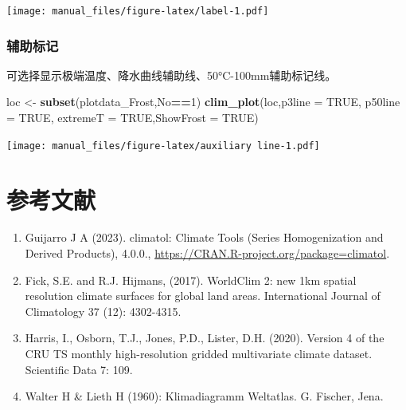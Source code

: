 \documentclass[
]{ctexart}
\newenvironment{Shaded}{\begin{snugshade}}{\end{snugshade}}
\newcommand{\AttributeTok}[1]{\textcolor[rgb]{0.13,0.29,0.53}{#1}}
\newcommand{\ConstantTok}[1]{\textcolor[rgb]{0.56,0.35,0.01}{#1}}
\newcommand{\DecValTok}[1]{\textcolor[rgb]{0.00,0.00,0.81}{#1}}
\newcommand{\FunctionTok}[1]{\textcolor[rgb]{0.13,0.29,0.53}{\textbf{#1}}}
\newcommand{\NormalTok}[1]{#1}
\newcommand{\OtherTok}[1]{\textcolor[rgb]{0.56,0.35,0.01}{#1}}
\newcommand{\SpecialCharTok}[1]{\textcolor[rgb]{0.81,0.36,0.00}{\textbf{#1}}}
\begin{document}
\texttt{[image: manual\_files/figure-latex/label-1.pdf]}

\hypertarget{ux8f85ux52a9ux6807ux8bb0}{%
\subsubsection{辅助标记}\label{ux8f85ux52a9ux6807ux8bb0}}

可选择显示极端温度、降水曲线辅助线、50°C-100mm辅助标记线。

\begin{Shaded}
\begin{Highlighting}[]
\NormalTok{loc }\OtherTok{\textless{}{-}} \FunctionTok{subset}\NormalTok{(plotdata\_Frost,No}\SpecialCharTok{==}\DecValTok{1}\NormalTok{)}
\FunctionTok{clim\_plot}\NormalTok{(loc,}\AttributeTok{p3line =} \ConstantTok{TRUE}\NormalTok{,}
          \AttributeTok{p50line =} \ConstantTok{TRUE}\NormalTok{,}
          \AttributeTok{extremeT =} \ConstantTok{TRUE}\NormalTok{,}\AttributeTok{ShowFrost =} \ConstantTok{TRUE}\NormalTok{)}
\end{Highlighting}
\end{Shaded}

\texttt{[image: manual\_files/figure-latex/auxiliary line-1.pdf]}

\hypertarget{ux53c2ux8003ux6587ux732e}{%
\section{参考文献}\label{ux53c2ux8003ux6587ux732e}}

\begin{enumerate}
\def\labelenumi{\arabic{enumi}.}
\item
  Guijarro J A (2023). climatol: Climate Tools (Series Homogenization
  and Derived Products), 4.0.0.,
  \url{https://CRAN.R-project.org/package=climatol}.
\item
  Fick, S.E. and R.J. Hijmans, (2017). WorldClim 2: new 1km spatial
  resolution climate surfaces for global land areas. International
  Journal of Climatology 37 (12): 4302-4315.
\item
  Harris, I., Osborn, T.J., Jones, P.D., Lister, D.H. (2020). Version 4
  of the CRU TS monthly high-resolution gridded multivariate climate
  dataset. Scientific Data 7: 109.
\item
  Walter H \& Lieth H (1960): Klimadiagramm Weltatlas. G. Fischer, Jena.
\end{enumerate}
\end{document}
